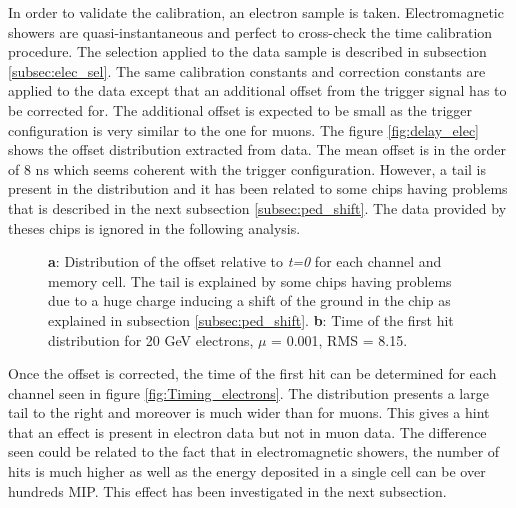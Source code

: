 \documentclass[twoside,a4paper,11pt]{article}
\begin{document}
In order to validate the calibration, an electron sample is taken. Electromagnetic showers are quasi-instantaneous and perfect to cross-check the time calibration procedure. The selection applied to the data sample is described in subsection \ref{subsec:elec_sel}. The same calibration constants and correction constants are applied to the data except that an additional offset from the trigger signal has to be corrected for. The additional offset is expected to be small as the trigger configuration is very similar to the one for muons. The figure \ref{fig:delay_elec} shows the offset distribution extracted from data. The mean offset is in the order of 8 ns which seems coherent with the trigger configuration. However, a tail is present in the distribution and it has been related to some chips having problems that is described in the next subsection \ref{subsec:ped_shift}. The data provided by theses chips is ignored in the following analysis.
\begin{figure}[htbp]
	\caption[]{\textbf{a}: Distribution of the offset relative to \textit{t=0} for each channel and memory cell. The tail is explained by some chips having problems due to a huge charge inducing a shift of the ground in the chip as explained in subsection \ref{subsec:ped_shift}. \textbf{b}: Time of the first hit distribution for 20 GeV electrons, $\mu$ = 0.001, RMS = 8.15.}
\end{figure}
Once the offset is corrected, the time of the first hit can be determined for each channel seen in figure \ref{fig:Timing_electrons}. The distribution presents a large tail to the right and moreover is much wider than for muons. This gives a hint that an effect is present in electron data but not in muon data. The difference seen could be related to the fact that in electromagnetic showers, the number of hits is much higher as well as the energy deposited in a single cell can be over hundreds MIP. This effect has been investigated in the next subsection. 
\end{document}

